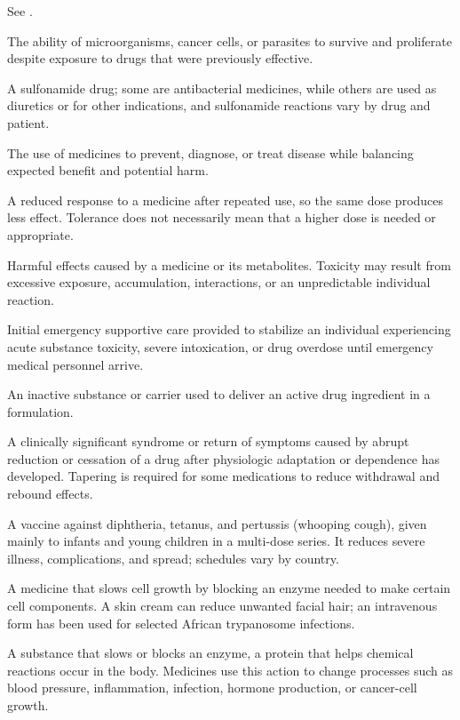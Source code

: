  See .

 The ability of microorganisms, cancer cells, or parasites to survive and proliferate
despite exposure to drugs that were previously effective.

 A sulfonamide drug; some are antibacterial medicines, while others are used as diuretics or for other indications, and sulfonamide reactions vary by drug and patient.

 The use of medicines to prevent, diagnose, or treat disease while balancing expected benefit and
potential harm.

 A reduced response to a medicine after repeated use, so the same dose produces less effect. Tolerance does not necessarily mean that a higher dose is needed or appropriate.

 Harmful effects caused by a medicine or its metabolites. Toxicity may result from excessive exposure, accumulation, interactions, or an unpredictable individual reaction.

 Initial emergency supportive care provided to stabilize an individual experiencing acute substance toxicity, severe intoxication, or drug overdose until emergency medical personnel arrive.

 An inactive substance or carrier used to deliver an active drug ingredient in a formulation.

 A clinically significant syndrome or return of symptoms caused by abrupt reduction or
cessation of a drug after physiologic adaptation or dependence has developed. Tapering
is required for some medications to reduce withdrawal and rebound effects.

 A vaccine against diphtheria, tetanus, and pertussis (whooping cough), given mainly to infants and young children in a multi-dose series. It reduces severe illness, complications, and spread; schedules vary by country.

 A medicine that slows cell growth by blocking an enzyme needed to make certain cell components. A skin cream can reduce unwanted facial hair; an intravenous form has been used for selected African trypanosome infections.


 A substance that slows or blocks an enzyme, a protein that helps chemical reactions occur in the body. Medicines use this action to change processes such as blood pressure, inflammation, infection, hormone production, or cancer-cell growth.



